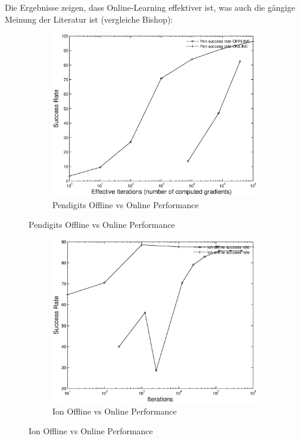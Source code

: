 \documentclass{article}
\begin{document}
	Die Ergebnisse zeigen, dass Online-Learning effektiver ist, was auch die gängige Meinung der Literatur ist (vergleiche Bishop):
	\begin{figure}[H]
	  \begin{subfigure}
	    \centering
	    \includegraphics[scale=0.75]{task1-pen-1.eps}
      \caption{Pendigits Offline vs Online Performance}
	  \end{subfigure}
	\end{figure}

	\begin{figure}[H]
	  \begin{subfigure}
	    \centering
	    \includegraphics[scale=0.75]{task1-ion-1.eps}
      \caption{Ion Offline vs Online Performance}
	  \end{subfigure}
	\end{figure}
\end{document}
